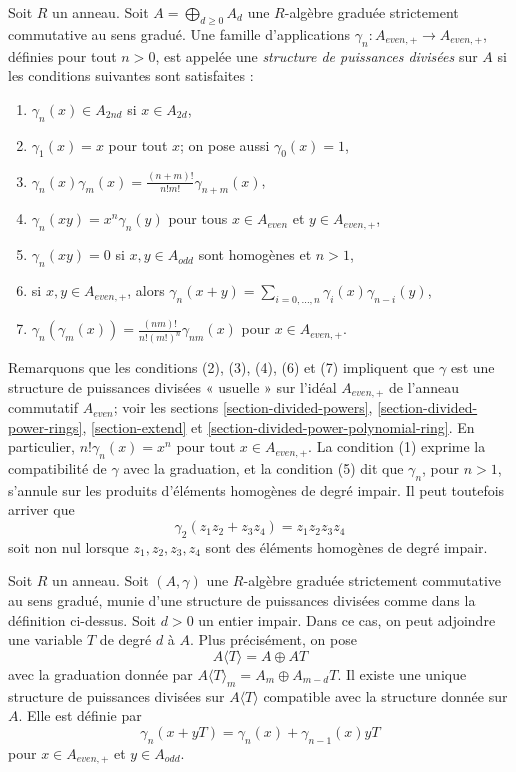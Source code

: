 \begin{definition}
\label{definition-divided-powers-graded}
Soit $R$ un anneau. Soit $A = \bigoplus_{d \geq 0} A_d$ une
$R$-algèbre graduée strictement commutative au sens gradué. Une famille d'applications
$\gamma_n : A_{even, +} \to A_{even, +}$, définies pour tout $n > 0$, est appelée
une {\it structure de puissances divisées} sur $A$ si les conditions suivantes sont satisfaites :
\begin{enumerate}
\item $\gamma_n(x) \in A_{2nd}$ si $x \in A_{2d}$,
\item $\gamma_1(x) = x$ pour tout $x$; on pose aussi $\gamma_0(x) = 1$,
\item $\gamma_n(x)\gamma_m(x) = \frac{(n + m)!}{n! m!} \gamma_{n + m}(x)$,
\item $\gamma_n(xy) = x^n \gamma_n(y)$ pour tous $x \in A_{even}$ et
$y \in A_{even, +}$,
\item $\gamma_n(xy) = 0$ si $x, y \in A_{odd}$ sont homogènes et $n > 1$,
\item si $x, y \in A_{even, +}$, alors
$\gamma_n(x + y) = \sum_{i = 0, \ldots, n} \gamma_i(x)\gamma_{n - i}(y)$,
\item $\gamma_n(\gamma_m(x)) =
\frac{(nm)!}{n! (m!)^n} \gamma_{nm}(x) $ pour $ x \in A_{even, +}$.
\end{enumerate}
\end{definition}

\noindent
Remarquons que les conditions (2), (3), (4), (6) et (7) impliquent que
$\gamma$ est une structure de puissances divisées « usuelle » sur l'idéal
$A_{even, +}$ de l'anneau commutatif $A_{even}$; voir
les sections \ref{section-divided-powers},
\ref{section-divided-power-rings},
\ref{section-extend} et
\ref{section-divided-power-polynomial-ring}.
En particulier, $n! \gamma_n(x) = x^n$ pour tout $x \in A_{even, +}$.
La condition (1) exprime la compatibilité de $\gamma$ avec la graduation, et la condition
(5) dit que $\gamma_n$, pour $n > 1$, s'annule sur les
produits d'éléments homogènes de degré impair. Il peut toutefois arriver
que
$$
\gamma_2(z_1 z_2 + z_3 z_4) = z_1z_2z_3z_4
$$
soit non nul lorsque $z_1, z_2, z_3, z_4$ sont des éléments homogènes de degré impair.

\begin{example}
\label{example-adjoining-odd}
Soit $R$ un anneau. Soit $(A, \gamma)$ une
$R$-algèbre graduée strictement commutative au sens gradué, munie d'une structure de puissances divisées
comme dans la définition ci-dessus. Soit $d > 0$ un entier impair.
Dans ce cas, on peut adjoindre une variable $T$ de degré $d$ à $A$.
Plus précisément, on pose
$$
A\langle T \rangle = A \oplus AT
$$
avec la graduation donnée par $A\langle T \rangle_m = A_m \oplus A_{m - d}T$.
Il existe une unique structure de puissances divisées sur
$A\langle T \rangle$ compatible avec la structure
donnée sur $A$. Elle est définie par
$$
\gamma_n(x + yT) = \gamma_n(x) + \gamma_{n - 1}(x)yT
$$
pour $x \in A_{even, +}$ et $y \in A_{odd}$.
\end{example}

